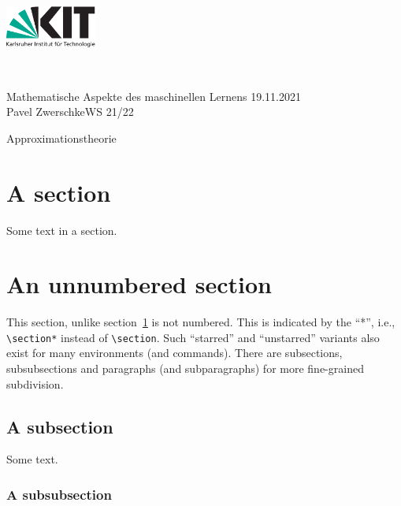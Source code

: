 \documentclass[11pt]{scrartcl}
\def\Semester{WS 21/22}
\def\Seminar{Mathematische Aspekte des maschinellen Lernens}
\def\Title{Approximationstheorie}
\def\Author{Pavel Zwerschke}
\def\Date{19.11.2021} %
\begin{document}
\vspace*{-2cm}
\begin{minipage}{3cm}
	\includegraphics[width=3cm]{./logos/kit-de.pdf} %
\end{minipage}\hspace*{0.2cm}~
\begin{minipage}{14cm}{
		\sffamily \Large{\Seminar} \hfill \Date \\ 
		\Author \hfill \Semester
}\end{minipage}
\vspace{-0.5cm}
\begin{center}
	\huge \sffamily \Title
\end{center}
\vspace{-1cm}

\section{A section}
\label{sec:a-section}

Some text in a section.

\section*{An unnumbered section}

This section, unlike section~\ref{sec:a-section} is not numbered.
This is indicated by the ``*'', i.e., \verb|\section*| instead of \verb|\section|.
Such ``starred'' and ``unstarred'' variants also exist for many environments (and commands).
There are subsections, subsubsections and paragraphs (and subparagraphs) for more fine-grained subdivision.

\subsection*{A subsection}

Some text.

\subsubsection*{A subsubsection}
\end{document}
